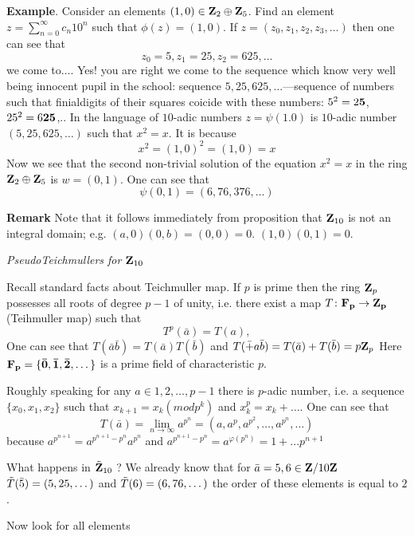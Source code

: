  {\bf Example}. Consider an elements $(1,0)\in {\bf Z}_2\oplus {\bf Z}_5$.
   Find an element $z=\sum_{n=0}^\infty c_n10^n$ such that $\phi (z)=(1,0)$.
   If $z=(z_0,z_1,z_2,z_3,\dots)$ then one can see that
                   $$
         z_0=5, z_1=25, z_2=625,...
                   $$
we come to.... Yes! you are right we come to the sequence which know very well being innocent pupil in the school:
 sequence ${5,25,625,\dots}$---sequence of numbers such that finialdigits of their squares coicide with these numbers:
   $5^2=2{\bf 5}$,  $25^2=6{\bf 25}$,..  In the language of $10$-adic numbers $z=\psi(1.0)$ is $10$-adic number
   $(5,25,625,\dots)$ such that $x^2=x$. It is because
                   $$
       x^2=(1,0)^2=(1,0)=x
                   $$
Now we see that the second non-trivial solution of the equation $x^2=x$ in the ring ${\bf Z}_2\oplus {\bf Z}_{5}$ is
$w=(0,1)$. One can see that
                   $$
       \psi(0,1)=(6,76,376,\dots)
                   $$

\m

{\bf Remark} Note that it follows immediately from proposition that ${\bf Z}_{10}$ is not an integral domain;
e.g. $(a,0)(0,b)=(0,0)=0$.
 $(1,0)(0,1)=0$.


\bigskip

\centerline {\it PseudoTeichmullers for ${\bf Z}_{10}$\it }
\m
\def\F{\bf F}
 Recall standard facts about Teichmuller map.
If $p$ is prime then  the
ring ${\bf Z}_p$ possesses all roots of degree $p-1$ of unity, i.e. there exist a map
$T\colon \F_p\to \Z_p$ (Teihmuller map) such that
                $$
                T^p(\bar a)=T(a),
                    $$
One can see that $T(\bar a\bar b)=T(\bar a)T(\bar b)$ and $T(\bar +a\bar b)=T(\bar a)+T(\bar b)=p{\bf Z}_p$
Here $\F_p=\{\bar 0,\bar 1,\bar 2,\dots\}$ is a prime field of characteristic $p$.

 Roughly speaking for any $a\in {1,2,\dots,p-1}$ there is $p$-adic number, i.e.  a sequence $\{x_0,x_1,x_2\}$
 such that $x_{k+1}=x_k (mod p^k)$ and $x_k^p=x_k+\dots$.
 One can see that
                 $$
         T(\bar a)=\lim_{n\to\infty}a^{p^n}=(a,a^p,a^{p^2},\dots,a^{p^n},\dots)
                 $$
because $a^{p^{n+1}}=a^{p^{n+1}-p^n}a^{p^n}$ and $a^{p^{n+1}-p^n}=a^{\varphi(p^n)}=1+...p^{n+1}$


What happens in  $\tilde{{\bf Z}}_{10}$ ?  We already know that for $\bar a=5,6\in {\bf Z}\slash 10{\bf Z}$
$\tilde T(\bar 5)=(5,25,\dots)$ and $\tilde T(6)=(6,76,\dots)$
the order of these elements is equal to $2$.


Now look for all elements

